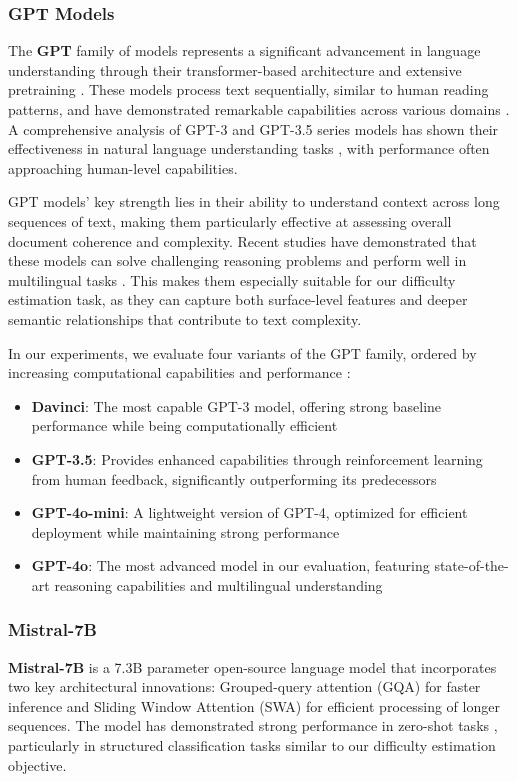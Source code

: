 \subsubsection{GPT Models}
The \textbf{GPT} family of models represents a significant advancement in language understanding through their transformer-based architecture and extensive pretraining \cite{GPT,GPT3}. These models process text sequentially, similar to human reading patterns, and have demonstrated remarkable capabilities across various domains \cite{douglas2023llm}. A comprehensive analysis of GPT-3 and GPT-3.5 series models has shown their effectiveness in natural language understanding tasks \cite{ye2023comprehensive}, with performance often approaching human-level capabilities.

GPT models' key strength lies in their ability to understand context across long sequences of text, making them particularly effective at assessing overall document coherence and complexity. Recent studies have demonstrated that these models can solve challenging reasoning problems \cite{binz2022cognitive} and perform well in multilingual tasks \cite{hendy2023translation}. This makes them especially suitable for our difficulty estimation task, as they can capture both surface-level features and deeper semantic relationships that contribute to text complexity.

In our experiments, we evaluate four variants of the GPT family, ordered by increasing computational capabilities and performance \cite{ye2023comprehensive,openai_gpt-4_2023}:
\begin{itemize}
    \item \textbf{Davinci}: The most capable GPT-3 model, offering strong baseline performance while being computationally efficient
    \item \textbf{GPT-3.5}: Provides enhanced capabilities through reinforcement learning from human feedback, significantly outperforming its predecessors
    \item \textbf{GPT-4o-mini}: A lightweight version of GPT-4, optimized for efficient deployment while maintaining strong performance
    \item \textbf{GPT-4o}: The most advanced model in our evaluation, featuring state-of-the-art reasoning capabilities and multilingual understanding
\end{itemize}

\subsubsection{Mistral-7B}
\textbf{Mistral-7B} is a 7.3B parameter open-source language model that incorporates two key architectural innovations: Grouped-query attention (GQA) for faster inference and Sliding Window Attention (SWA) for efficient processing of longer sequences. The model has demonstrated strong performance in zero-shot tasks \cite{Rebei2023Fine}, particularly in structured classification tasks similar to our difficulty estimation objective.

